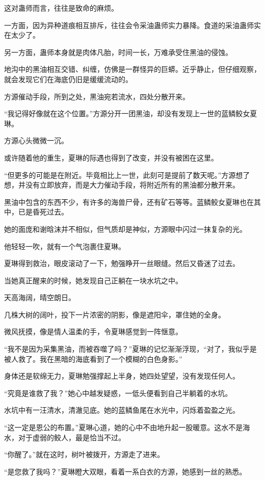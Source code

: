 \begin{this_body}
这对蛊师而言，往往是致命的麻烦。

一方面，因为异种道痕相互排斥，往往会令采油蛊师实力暴降。食道的采油蛊师实在太少了。

另一方面，蛊师本身就是肉体凡胎，时间一长，万难承受住黑油的侵蚀。

地沟中的黑油相互交错、纠缠，仿佛是一群怪异的巨蟒。近乎静止，但仔细观察，就会发现它们在海底仍旧是缓缓流动的。

方源催动手段，所到之处，黑油宛若流水，四处分散开来。

“我记得好像就在这个位置。”方源分开一团黑油，却没有发现上一世的蓝鳞鲛女夏琳。

方源心头微微一沉。

或许随着他的重生，夏琳的际遇也得到了改变，并没有被困在这里。

“但更多的可能是在附近。毕竟相比上一世，此刻可是提前了数天呢。”方源想了想，并没有立即放弃，而是大力催动手段，将附近所有的黑油都分散开来。

黑油中包含的东西不少，有许多的海兽尸骨，还有矿石等等。蓝鳞鲛女夏琳也在其中，已是昏死过去。

她的面庞和谢晗沫并不相似，但气质却是神似，方源眼中闪过一抹复杂的光。

他轻轻一吹，就有一个气泡裹住夏琳。

夏琳得到救治，眼皮滚动了一下，勉强睁开一丝眼缝。然后又昏迷了过去。

当她真正醒来的时候，她发现自己正躺在一块水坑之中。

天高海阔，晴空朗日。

几株大树的阔叶，投下一片浓密的阴影，像是遮阳伞，罩住她的全身。

微风抚摸，像是情人温柔的手，令夏琳感觉到一阵惬意。

“我不是因为采集黑油，而被吞噬了吗？”夏琳的记忆渐渐浮现，“对了，我似乎是被人救了。我在黑暗的海底看到了一个模糊的白色身影。”

身体还是软绵无力，夏琳勉强撑起上半身，她四处望望，没有发现任何人。

“究竟是谁救了我？”她心中越发疑惑，一低头便看到自己半躺着的水坑。

水坑中有一汪清水，清澈见底。她的蓝鳞鱼尾在水光中，闪烁着盈盈之光。

“这一定是恩公的布置。”夏琳心道，她的心中不由地升起一股暖意。这水不是海水，对于虚弱的鲛人，最是恰当不过。

“你醒了。”就在这时，树叶被拨开，方源走了进来。

“是您救了我吗？”夏琳瞪大双眼，看着一系白衣的方源，她感到一丝的熟悉。


\end{this_body}
